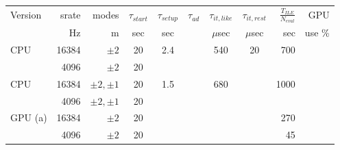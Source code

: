 \documentclass[twocolumn,prd,nofootinbib]{revtex4}
\begin{document}
\begin{table}
\begin{tabular}{lrr|ccccc|rr}
Version & srate & modes & $\tau_{start}$ & $\tau_{setup}$ & $\tau_{ad}$ & $\tau_{it,like}$ &$\tau_{it,rest}$ &
$\frac{T_{ILE}}{N_{eval}}$ & GPU \\  %
  &   Hz & m & sec & sec & & $\mu$sec & $\mu$sec  &sec  & use  \%\\ \hline 
CPU & 16384 & $\pm 2 $ & 20 & 2.4 &&540 & 20 &  700  \\ 
       & 4096 & $\pm 2 $ &   20 \\ \hline
%    
CPU & 16384 & $\pm 2,\pm 1 $ & 20 & 1.5 && 680 & &  1000  \\ 
       & 4096 & $ \pm 2, \pm 1 $ &   20 \\ \hline
GPU (a) & 16384 & $\pm 2 $  & 20  & & && & 270 \\
            & 4096 &$\pm 2 $  &  20 &  & & && 45 \\ \hline

\end{tabular}
\end{table}
\end{document}
